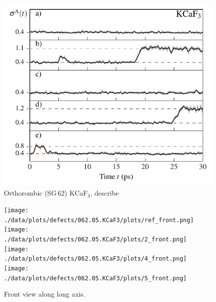 \documentclass[nobib,a4paper,twoside,notoc,justified,marginals=justified]{tufte-book}
\begin{document}
\begin{figure}
	\includegraphics[width=\textwidth]{./data/plots/defects/062.05.KCaF3/sigma_vs_time.pdf}
	\caption{Orthorombic (SG\,62) KCaF$_3$, describe}
	\label{}
\end{figure}

\begin{figure}
	\texttt{[image: ./data/plots/defects/062.05.KCaF3/plots/ref\_front.png]} \hfill
	\texttt{[image: ./data/plots/defects/062.05.KCaF3/plots/2\_front.png]} \\
	\texttt{[image: ./data/plots/defects/062.05.KCaF3/plots/4\_front.png]} \hfill
	\texttt{[image: ./data/plots/defects/062.05.KCaF3/plots/5\_front.png]}
	\caption{Front view along long axis.}
	\label{}
\end{figure}
\end{document}
